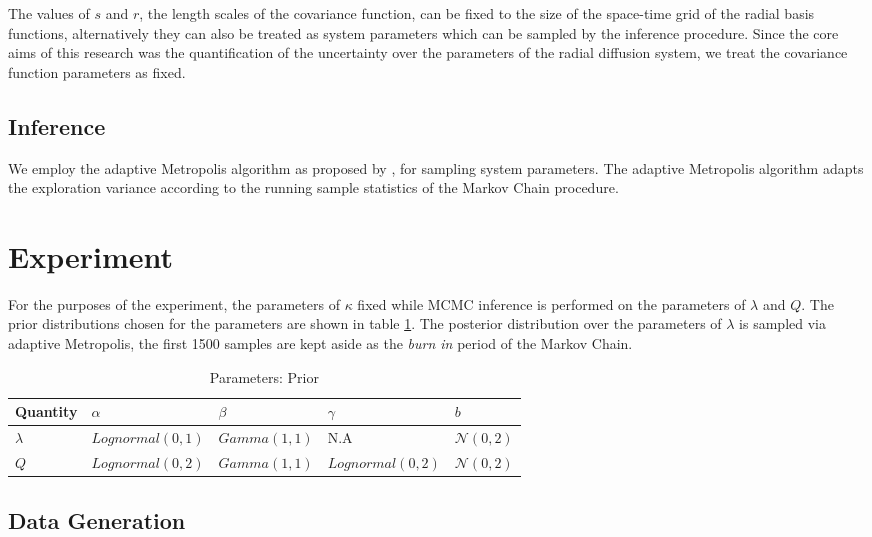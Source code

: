 \documentclass{article}
\begin{document}
The values of $s$ and $r$, the length scales of the covariance function, 
can be fixed to the size of the space-time grid of the radial basis functions, 
alternatively they can also be treated as system parameters which can be sampled 
by the inference procedure. Since the core aims of this research was the quantification
of the uncertainty over the parameters of the radial diffusion system, 
we treat the covariance function parameters as fixed.

\subsection{Inference}

We employ the adaptive Metropolis algorithm as proposed by \citet{haario2001}, for sampling
system parameters. The adaptive Metropolis algorithm adapts the exploration variance according
to the running sample statistics of the Markov Chain procedure.


\section{Experiment}

For the purposes of the experiment, the parameters of $\kappa$ fixed while MCMC inference 
is performed on the parameters of $\lambda$ and $Q$. The prior distributions chosen for the parameters 
are shown in table \ref{tab:prior}. The posterior distribution over the parameters of $\lambda$ is 
sampled via adaptive Metropolis, the first 1500 samples are kept aside as the \emph{burn in} period
of the Markov Chain.

\begin{table}[t]
  \caption{Parameters: Prior}
  \label{tab:prior}
  \centering
  \begin{tabular}{lllll}
    \toprule
    \cmidrule{1-2}
    Quantity     & $\alpha$     & $\beta$ & $\gamma$ & $b$ \\
    \midrule
    $\lambda$ & $Lognormal(0, 1)$ & $Gamma(1, 1)$ & N.A & $\mathcal{N}(0, 2)$ \\
    $Q$ & $Lognormal(0, 2)$ & $Gamma(1, 1)$ & $Lognormal(0, 2)$ & $\mathcal{N}(0, 2)$ \\
    \bottomrule
  \end{tabular}
\end{table}


\subsection*{Data Generation}
\end{document}
